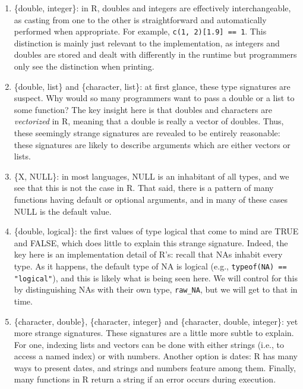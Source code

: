 \documentclass[acmsmall,10pt,review,anonymous]{acmart}\settopmatter{printfolios=true,printccs=false,printacmref=false}
\newcommand{\code}[1]{\lstinline|#1|\xspace}
\begin{document}
\begin{enumerate}

	\item \{double, integer\}: in R, doubles and integers are effectively interchangeable, as casting from one to the other is straightforward and automatically performed when appropriate.
	For example, \code{c(1, 2)[1.9] == 1}.
	This distinction is mainly just relevant to the implementation, as integers and doubles are stored and dealt with differently in the runtime but programmers only see the distinction when printing.
	
	\item \{double, list\} and \{character, list\}: at first glance, these type signatures are suspect.
	Why would so many programmers want to pass a double or a list to some function?
	The key insight here is that doubles and characters are {\it vectorized} in R, meaning that a double is really a vector of doubles.
	Thus, these seemingly strange signatures are revealed to be entirely reasonable: these signatures are likely to describe arguments which are either vectors or lists.
	
	\item \{X, NULL\}: in most languages, NULL is an inhabitant of all types, and we see that this is not the case in R.
	That said, there is a pattern of many functions having default or optional arguments, and in many of these cases NULL is the default value.
	
	\item \{double, logical\}: the first values of type logical that come to mind are TRUE and FALSE, which does little to explain this strange signature.
	Indeed, the key here is an implementation detail of R's: recall that NAs inhabit every type.
	As it happens, the default type of NA is logical (e.g., \code{typeof(NA) == "logical"}), and this is likely what is being seen here.
	We will control for this by distinguishing NAs with their own type, {\tt raw\_NA}, but we will get to that in time.
	
	\item \{character, double\}, \{character, integer\} and \{character, double, integer\}: yet more strange signatures.
	These signatures are a little more subtle to explain.
	For one, indexing lists and vectors can be done with either strings (i.e., to access a named index) or with numbers.
	Another option is dates: R has many ways to present dates, and strings and numbers feature among them.
	Finally, many  functions in R return a string if an error occurs during execution.

\end{enumerate}
\end{document}
